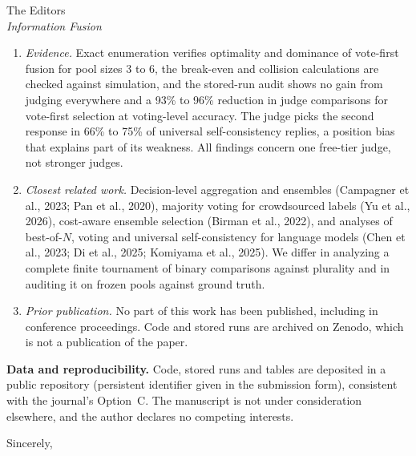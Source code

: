 \documentclass[11pt]{letter}
\begin{document}
\begin{letter}{The Editors \\ \emph{Information Fusion}}
\begin{enumerate}[leftmargin=*,itemsep=3pt]
\item \emph{Evidence.} Exact enumeration verifies optimality and dominance of vote-first fusion for pool sizes 3 to 6, the break-even and collision calculations are checked against simulation, and the stored-run audit shows no gain from judging everywhere and a 93\% to 96\% reduction in judge comparisons for vote-first selection at voting-level accuracy. The judge picks the second response in 66\% to 75\% of universal self-consistency replies, a position bias that explains part of its weakness. All findings concern one free-tier judge, not stronger judges.
\item \emph{Closest related work.} Decision-level aggregation and ensembles (Campagner et al., 2023; Pan et al., 2020), majority voting for crowdsourced labels (Yu et al., 2026), cost-aware ensemble selection (Birman et al., 2022), and analyses of best-of-$N$, voting and universal self-consistency for language models (Chen et al., 2023; Di et al., 2025; Komiyama et al., 2025). We differ in analyzing a complete finite tournament of binary comparisons against plurality and in auditing it on frozen pools against ground truth.
\item \emph{Prior publication.} No part of this work has been published, including in conference proceedings. Code and stored runs are archived on Zenodo, which is not a publication of the paper.
\end{enumerate}

\textbf{Data and reproducibility.} Code, stored runs and tables are deposited in a public repository (persistent identifier given in the submission form), consistent with the journal's Option~C. The manuscript is not under consideration elsewhere, and the author declares no competing interests.

\closing{Sincerely,}

\end{letter}
\end{document}
